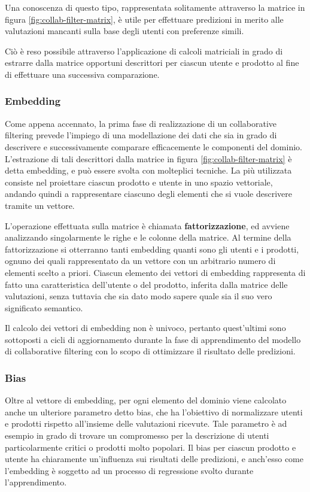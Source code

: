 \documentclass[hidelinks, 12pt]{article}
\begin{document}
Una conoscenza di questo tipo, rappresentata solitamente attraverso la matrice in figura \ref{fig:collab-filter-matrix}, è utile per effettuare predizioni in merito alle valutazioni mancanti sulla base degli utenti con preferenze simili.

Ciò è reso possibile attraverso l'applicazione di calcoli matriciali in grado di estrarre dalla matrice opportuni descrittori per ciascun utente e prodotto al fine di effettuare una successiva comparazione.


\subsubsection{Embedding}

Come appena accennato, la prima fase di realizzazione di un collaborative filtering prevede l'impiego di una modellazione dei dati che sia in grado di descrivere e successivamente comparare efficacemente le componenti del dominio. L'estrazione di tali descrittori dalla matrice in figura \ref{fig:collab-filter-matrix} è detta embedding, e può essere svolta con molteplici tecniche. La più utilizzata consiste nel proiettare ciascun prodotto e utente in uno spazio vettoriale, andando quindi a rappresentare ciascuno degli elementi che si vuole descrivere tramite un vettore. 

L'operazione effettuata sulla matrice è chiamata \textbf{fattorizzazione}, ed avviene analizzando singolarmente le righe e le colonne della matrice. Al termine della fattorizzazione si otterranno tanti embedding quanti sono gli utenti e i prodotti, ognuno dei quali rappresentato da un vettore con un arbitrario numero di elementi scelto a priori. Ciascun elemento dei vettori di embedding rappresenta di fatto una caratteristica dell'utente o del prodotto, inferita dalla matrice delle valutazioni, senza tuttavia che sia dato modo sapere quale sia il suo vero significato semantico.

Il calcolo dei vettori di embedding non è univoco, pertanto quest'ultimi sono sottoposti a cicli di aggiornamento durante la fase di apprendimento del modello di collaborative filtering con lo scopo di ottimizzare il risultato delle predizioni.


\subsubsection{Bias}

Oltre al vettore di embedding, per ogni elemento del dominio viene calcolato anche un ulteriore parametro detto bias, che ha l'obiettivo di normalizzare utenti e prodotti rispetto all'insieme delle valutazioni ricevute. Tale parametro è ad esempio in grado di trovare un compromesso per la descrizione di utenti particolarmente critici o prodotti molto popolari. Il bias per ciascun prodotto e utente ha chiaramente un'influenza sui risultati delle predizioni, e anch'esso come l'embedding è soggetto ad un processo di regressione svolto durante l'apprendimento.
\end{document}

